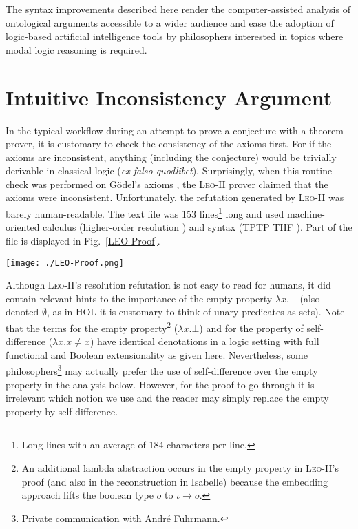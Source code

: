 \documentclass{article}
\newcommand{\imp}{{\rightarrow}}
\begin{document}
The syntax improvements described here render the computer-assisted analysis of ontological arguments accessible to a wider audience and ease the adoption of logic-based artificial intelligence tools by philosophers interested in topics where modal logic reasoning is required.


\section{Intuitive Inconsistency Argument} \label{sec:inconsistency}

In the typical workflow during an attempt to prove a conjecture with a theorem prover, it is customary to check the consistency of the axioms first. For if the axioms are inconsistent, anything (including the conjecture) would be trivially derivable in classical logic (\emph{ex falso quodlibet}). Surprisingly, when this routine check was performed on G\"odel's axioms \cite{C40}, the \textsc{Leo-II} prover claimed that the axioms were inconsistent. Unfortunately, the refutation generated by \textsc{Leo-II} was barely human-readable. The text file was 153 lines\footnote{Long lines with an average of 184 characters per line.} long and used machine-oriented calculus (higher-order resolution \cite{W47}) and syntax (TPTP THF \cite{J22}). Part of the file is displayed in Fig.~\ref{LEO-Proof}.

\begin{figure*}
\centerline{\texttt{[image: ./LEO-Proof.png]}}
\caption{Lines 115--120 of \textsc{Leo-II}'s refutation. Primitive
  substitutions (e.g. with the empty property) are highlighted. In the
red part (see $\boldsymbol{\leftarrow}$), property variable $\texttt{SV8}$ has been instantiated with the
$\lambda \texttt{SV16}_{\mu}. \lambda \texttt{SV17}_{\iota}. \bot$, i.e., the (lifted) empty property.
} \label{LEO-Proof}
\end{figure*}

Although \textsc{Leo-II}'s resolution refutation is not easy to read
for humans, it did contain relevant hints to the importance of the
empty property $\lambda x. \bot$ (also denoted $\emptyset$, as in HOL it is customary to think of unary predicates as sets).
%
Note that the terms for the empty property\footnote{An additional lambda abstraction occurs in the empty property in \textsc{Leo-II}'s proof (and also in the reconstruction in Isabelle) because the embedding approach lifts the boolean type $o$ to $\iota \imp o$.} ($\lambda x. \bot$) and for the property of self-difference ($\lambda x.  x\not=x$) have identical denotations in a logic setting
with full functional and Boolean extensionality as given
here. Nevertheless, some philosophers\footnote{Private communication with Andr\'e Fuhrmann.} may actually prefer the use of
self-difference over the empty property in
the analysis below. However, for the proof to go through it is
irrelevant which notion we use and the reader may simply replace the
empty property by self-difference.
\end{document}
